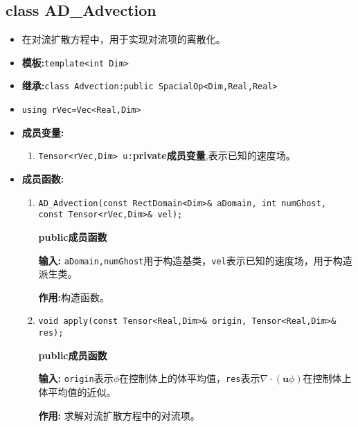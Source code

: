 \documentclass[UTF8]{ctexart}
\theoremstyle{plain}
\theoremstyle{definition}
\theoremstyle{remark}
\begin{document}
\subsection{class AD\_Advection}
\begin{itemize}
    \item 在对流扩散方程中，用于实现对流项的离散化。
    \item \textbf{模板:}\texttt{template<int Dim>}
    \item \textbf{继承:}\texttt{class Advection:public SpacialOp<Dim,Real,Real>}
    \item \texttt{using rVec=Vec<Real,Dim>}
    \item \textbf{成员变量:}
    \begin{enumerate}
        \item \texttt{Tensor<rVec,Dim> u:}\textbf{private成员变量},表示已知的速度场。
    \end{enumerate}
    \item \textbf{成员函数:}
    \begin{enumerate}
        \item \texttt{AD\_Advection(const RectDomain<Dim>\& aDomain, int numGhost,\\ const Tensor<rVec,Dim>\& vel);}
        
        \textbf{public成员函数}

        \textbf{输入:} \texttt{aDomain,numGhost}用于构造基类，\texttt{vel}表示已知的速度场，用于构造派生类。

        \textbf{作用:}构造函数。

        \item \texttt{void apply(const Tensor<Real,Dim>\& origin, Tensor<Real,Dim>\& res);}
        
        \textbf{public成员函数}

        \textbf{输入:} \texttt{origin}表示$\phi$在控制体上的体平均值，\texttt{res}表示$\nabla\cdot(\textbf{u}\phi)$在控制体上体平均值的近似。

        \textbf{作用:} 求解对流扩散方程中的对流项。
    \end{enumerate}
\end{itemize}
\end{document}

